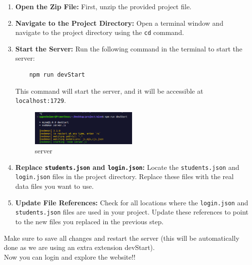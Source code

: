 \documentclass{article}
\begin{document}
\begin{enumerate}
    \item \textbf{Open the Zip File:} First, unzip the provided project file.
    \item \textbf{Navigate to the Project Directory:} Open a terminal window and navigate to the project directory using the \texttt{cd} command.
    \item \textbf{Start the Server:} Run the following command in the terminal to start the server:
    \begin{verbatim}
    npm run devStart
    \end{verbatim}
    This command will start the server, and it will be accessible at \texttt{localhost:1729}.
    \begin{figure}[htbp] 
    \centering 
    \includegraphics[width=0.5\textwidth]{server.png} 
    \caption{server} 
    \label{server} 
    \end{figure}
    \item \textbf{Replace \texttt{students.json} and \texttt{login.json}:} 
    Locate the \texttt{students.json} and \texttt{login.json} files in the project directory. Replace these files with the real data files you want to use.
    \item \textbf{Update File References:} Check for all locations where the \texttt{login.json} and \texttt{students.json} files are used in your project. Update these references to point to the new files you replaced in the previous step.
\end{enumerate}

Make sure to save all changes and restart the server (this will be automatically done as we are using an extra extension devStart).\\
Now you can login and explore the website!!
\end{document}
